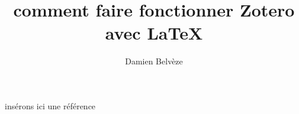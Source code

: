 \documentclass[12pt]{article}
\title{comment faire fonctionner Zotero avec LaTeX}
\author{Damien Belvèze}
\begin{document}
\maketitle

insérons ici une référence \cite{claveyMastodonRefugePour2023}

\printbibliography
\end{document}
